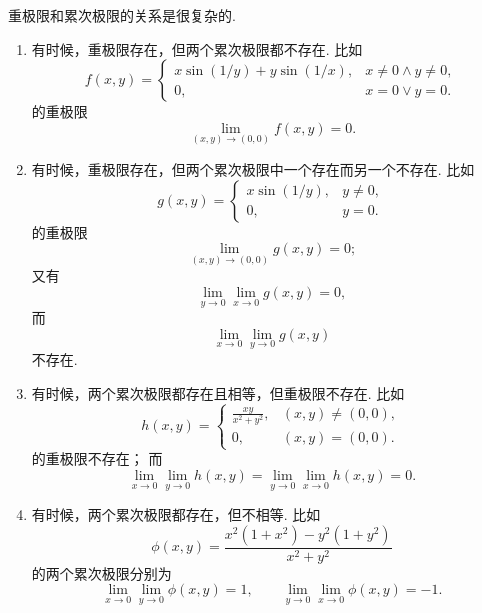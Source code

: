 \begin{example}
重极限和累次极限的关系是很复杂的.
\begin{enumerate}
	\item 有时候，重极限存在，但两个累次极限都不存在.
	比如\begin{equation*}
		f(x,y) = \left\{ \begin{array}{cl}
			x \sin(1/y) + y \sin(1/x), & x\neq0 \land y\neq0, \\
			0, & x=0 \lor y=0.
		\end{array} \right.
	\end{equation*}的重极限\begin{equation*}
		\lim_{(x,y)\to(0,0)} f(x,y) = 0.
	\end{equation*}

	\item 有时候，重极限存在，但两个累次极限中一个存在而另一个不存在.
	比如\begin{equation*}
		g(x,y) = \left\{ \begin{array}{cl}
			x \sin(1/y), & y\neq0, \\
			0, & y=0.
		\end{array} \right.
	\end{equation*}的重极限\begin{equation*}
		\lim_{(x,y)\to(0,0)} g(x,y) = 0;
	\end{equation*}
	又有\begin{equation*}
		\lim_{y\to0} \lim_{x\to0} g(x,y) = 0,
	\end{equation*}
	而\begin{equation*}
		\lim_{x\to0} \lim_{y\to0} g(x,y)
	\end{equation*}不存在.

	\item 有时候，两个累次极限都存在且相等，但重极限不存在.
	比如\begin{equation*}
		h(x,y) = \left\{ \begin{array}{cl}
			\frac{xy}{x^2+y^2}, & (x,y)\neq(0,0), \\
			0, & (x,y)=(0,0).
		\end{array} \right.
	\end{equation*}的重极限不存在；
	而\begin{equation*}
		\lim_{x\to0} \lim_{y\to0} h(x,y)
		= \lim_{y\to0} \lim_{x\to0} h(x,y) = 0.
	\end{equation*}

	\item 有时候，两个累次极限都存在，但不相等.
	比如\begin{equation*}
		\phi(x,y) = \frac{x^2(1+x^2) - y^2(1+y^2)}{x^2+y^2}
	\end{equation*}的两个累次极限分别为\begin{equation*}
		\lim_{x\to0} \lim_{y\to0} \phi(x,y) = 1,
		\qquad
		\lim_{y\to0} \lim_{x\to0} \phi(x,y) = -1.
	\end{equation*}
\end{enumerate}
\end{example}

